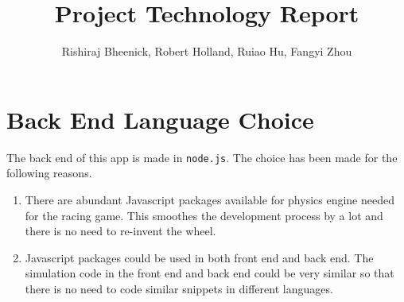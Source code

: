 \documentclass[a4paper]{article}
\title{Project Technology Report}
\author{Rishiraj Bheenick, Robert Holland, Ruiao Hu, Fangyi Zhou}
\begin{document}
\maketitle

\section{Back End Language Choice}

The back end of this app is made in \texttt{node.js}. The choice has been made
for the following reasons.
\begin{enumerate}
\item
There are abundant Javascript packages available for physics engine needed for
the racing game. This smoothes the development process by a lot and there is no
need to re-invent the wheel.
\item
Javascript packages could be used in both front end and back end. The
simulation code in the front end and back end could be very similar so that
there is no need to code similar snippets in different languages.
\end{enumerate}
\end{document}
